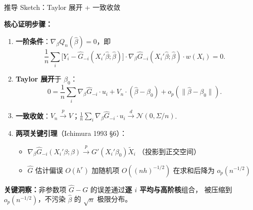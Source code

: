 \documentclass[aspectratio=169, 10pt]{beamer}
\begin{document}
\begin{frame}{推导 Sketch：Taylor 展开 + 一致收敛}

  \textbf{核心证明步骤：}

  \begin{enumerate}\setlength{\itemsep}{2pt}
    \item \textbf{一阶条件}：$\nabla_\beta Q_n(\hat\beta) = 0$，即
    $$\frac{1}{n}\sum_i \bigl[Y_i - \hat G_{-i}(X_i'\hat\beta; \hat\beta)\bigr]
    \cdot \nabla_\beta \hat G_{-i}(X_i'\hat\beta; \hat\beta) \cdot w(X_i) = 0.$$

    \item \textbf{Taylor 展开}于 $\beta_0$：
    $$0 = \frac{1}{n}\sum_i \nabla_\beta \hat G_{-i} \cdot u_i + V_n \cdot (\hat\beta - \beta_0) + o_p(\|\hat\beta - \beta_0\|).$$

    \item \textbf{一致收敛}：$V_n \overset{p}{\to} V$；$\frac{1}{n}\sum_i \nabla_\beta \hat G_{-i} \cdot u_i \overset{d}{\to} \mathcal{N}(0, \Sigma/n)$.

    \item \textbf{两项关键引理}（Ichimura 1993 §6）：
    \begin{itemize}\setlength{\itemsep}{1pt}
      \item $\nabla_\beta \hat G_{-i}(X_i'\beta; \beta) \overset{p}{\to} G'(X_i'\beta_0) \tilde X_i$
      （投影到正交空间）
      \item $\hat G$ 估计偏误 $O(h^r)$ 加随机项 $O((nh)^{-1/2})$ 在求和后降为 $o_p(n^{-1/2})$
    \end{itemize}
  \end{enumerate}

  \begin{keybox}
    \textbf{关键洞察：}非参数项 $\hat G - G$ 的误差通过\textbf{逐 $i$ 平均与高阶核}组合，
    被压缩到 $o_p(n^{-1/2})$，不污染 $\hat\beta$ 的 $\sqrt{n}$ 极限分布。
  \end{keybox}

  \hfill{\scriptsize\hyperlink{proof-c6}{}}

\end{frame}
\end{document}
